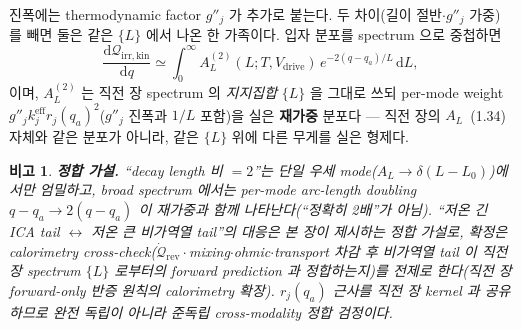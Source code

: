 \documentclass[11pt,a4paper]{article}
\newtheorem*{flagbox}{비고}
\newcommand{\dd}{\mathrm{d}}
\newcommand{\eff}{\mathrm{eff}}
\newcommand{\drive}{\mathrm{drive}}
\newcommand{\rev}{\mathrm{rev}}
\newcommand{\irr}{\mathrm{irr}}
\newcommand{\kin}{\mathrm{kin}}
\begin{document}
진폭에는 thermodynamic factor $g''_j$ 가 추가로 붙는다. 두 차이(길이 절반$\cdot$$g''_j$ 가중)를 빼면 둘은 같은
$\{L\}$ 에서 나온 한 가족이다. 입자 분포를 spectrum 으로 중첩하면
\begin{equation}
\boxed{\;\frac{\dd\mathcal Q_{\irr,\kin}}{\dd q}\simeq\int_0^\infty A_L^{(2)}(L;T,V_\drive)\,e^{-2(q-q_a)/L}\,\dd L,\;}
\label{eq:ch2_thermal_kernel}
\end{equation}
이며, $A_L^{(2)}$ 는 직전 장 spectrum 의 \emph{지지집합} $\{L\}$ 을 그대로 쓰되 per-mode weight
$g''_j k_j^{\eff} r_j(q_a)^2$($g''_j$ 진폭과 $1/L$ 포함)을 실은 \textbf{재가중} 분포다 — 직전 장의 $A_L$~(1.34)
자체와 같은 분포가 아니라, 같은 $\{L\}$ 위에 다른 무게를 실은 형제다.
\begin{flagbox}
\textbf{정합 가설.} ``decay length 비 $=2$''는 단일 우세 mode($A_L\to\delta(L-L_0)$)에서만 엄밀하고,
broad spectrum 에서는 per-mode arc-length doubling $q-q_a\to2(q-q_a)$ 이 \emph{재가중}과 함께 나타난다(``정확히
2배''가 아님). ``저온 긴 ICA tail $\leftrightarrow$ 저온 큰 비가역열 tail''의 대응은 본 장이 제시하는 정합 가설로,
\emph{확정}은 calorimetry cross-check($\dot{\mathcal Q}_\rev\cdot$mixing$\cdot$ohmic$\cdot$transport 차감 후 비가역열 tail 이
직전 장 spectrum $\{L\}$ 로부터의 forward prediction 과 정합하는지)를 전제로 한다(직전 장 forward-only 반증
원칙의 calorimetry 확장). $r_j(q_a)$ 근사를 직전 장 kernel 과 공유하므로 완전 독립이 아니라 \emph{준독립}
cross-modality 정합 검정이다.
\end{flagbox}
\end{document}
